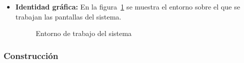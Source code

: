 \begin{itemize}
		\item \textbf{Identidad gráfica:} En la figura~\ref{fig:entornoTrabajo} se muestra el entorno sobre el que se trabajan las pantallas del sistema.
		
		\begin{figure}[htbp!]
			\begin{center}
				\caption{Entorno de trabajo del sistema}
				\label{fig:entornoTrabajo}
			\end{center}
		\end{figure}		
		
	\end{itemize}
	
	\subsubsection{Construcción}
	
